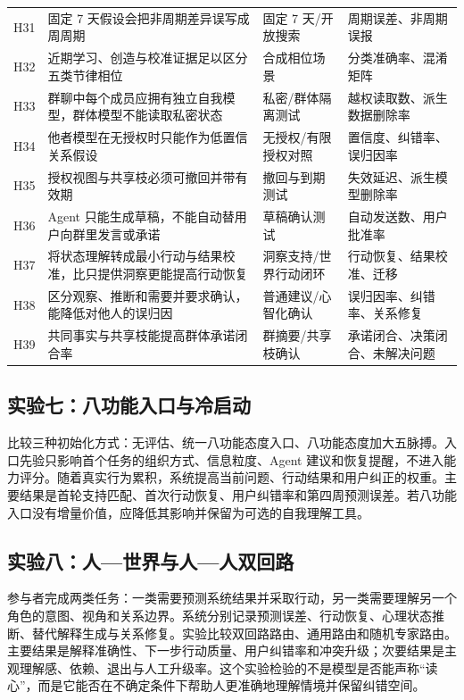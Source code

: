 \documentclass[UTF8,a4paper,11pt]{ctexart}
\begin{document}
\begin{center}
\begin{longtable}{@{}p{1.4cm}p{4.5cm}p{5.2cm}p{3.4cm}@{}}
H31 & 固定 7 天假设会把非周期差异误写成周周期 & 固定 7 天/开放搜索 & 周期误差、非周期误报 \\
H32 & 近期学习、创造与校准证据足以区分五类节律相位 & 合成相位场景 & 分类准确率、混淆矩阵 \\
H33 & 群聊中每个成员应拥有独立自我模型，群体模型不能读取私密状态 & 私密/群体隔离测试 & 越权读取数、派生数据删除率 \\
H34 & 他者模型在无授权时只能作为低置信关系假设 & 无授权/有限授权对照 & 置信度、纠错率、误归因率 \\
H35 & 授权视图与共享枝必须可撤回并带有效期 & 撤回与到期测试 & 失效延迟、派生模型删除率 \\
H36 & Agent 只能生成草稿，不能自动替用户向群里发言或承诺 & 草稿确认测试 & 自动发送数、用户批准率 \\
H37 & 将状态理解转成最小行动与结果校准，比只提供洞察更能提高行动恢复 & 洞察支持/世界行动闭环 & 行动恢复、结果校准、迁移 \\
H38 & 区分观察、推断和需要并要求确认，能降低对他人的误归因 & 普通建议/心智化确认 & 误归因率、纠错率、关系修复 \\
H39 & 共同事实与共享枝能提高群体承诺闭合率 & 群摘要/共享枝确认 & 承诺闭合、决策闭合、未解决问题 \\
\bottomrule
\end{longtable}
\end{center}


\subsection{实验七：八功能入口与冷启动}

比较三种初始化方式：无评估、统一八功能态度入口、八功能态度加大五脉搏。入口先验只影响首个任务的组织方式、信息粒度、Agent 建议和恢复提醒，不进入能力评分。随着真实行为累积，系统提高当前问题、行动结果和用户纠正的权重。主要结果是首轮支持匹配、首次行动恢复、用户纠错率和第四周预测误差。若八功能入口没有增量价值，应降低其影响并保留为可选的自我理解工具。

\subsection{实验八：人—世界与人—人双回路}

参与者完成两类任务：一类需要预测系统结果并采取行动，另一类需要理解另一个角色的意图、视角和关系边界。系统分别记录预测误差、行动恢复、心理状态推断、替代解释生成与关系修复。实验比较双回路路由、通用路由和随机专家路由。主要结果是解释准确性、下一步行动质量、用户纠错率和冲突升级；次要结果是主观理解感、依赖、退出与人工升级率。这个实验检验的不是模型是否能声称“读心”，而是它能否在不确定条件下帮助人更准确地理解情境并保留纠错空间。
\end{document}
